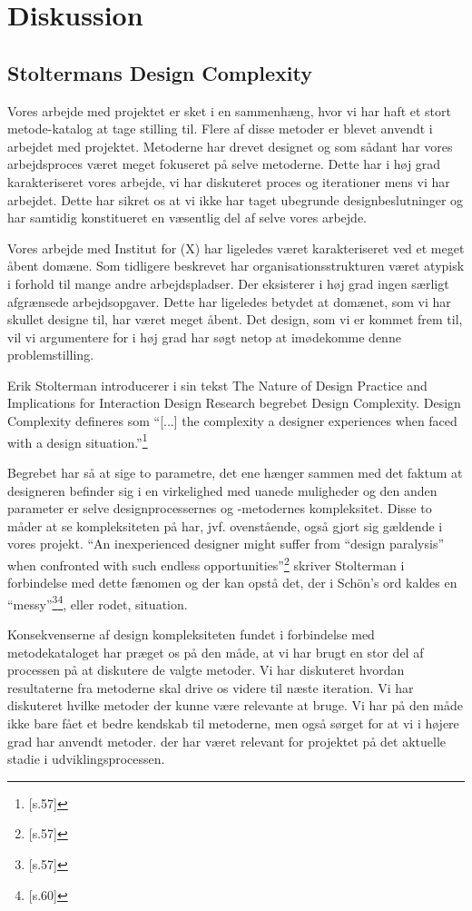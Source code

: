 \chapter{Diskussion}

\section{Stoltermans Design Complexity}
Vores arbejde med projektet er sket i en sammenhæng, hvor vi har haft et stort metode-katalog at tage stilling til. Flere af disse metoder er blevet anvendt i arbejdet med projektet. Metoderne har drevet designet og som sådant har vores arbejdsproces været meget fokuseret på selve metoderne. Dette har i høj grad karakteriseret vores arbejde, vi har diskuteret proces og iterationer mens vi har arbejdet. Dette har sikret os at vi ikke har taget ubegrunde designbeslutninger og har samtidig konstitueret en væsentlig del af selve vores arbejde.

Vores arbejde med Institut for (X) har ligeledes været karakteriseret ved et meget åbent domæne. Som tidligere beskrevet har organisationsstrukturen været atypisk i forhold til mange andre arbejdspladser. Der eksisterer i høj grad ingen særligt afgrænsede arbejdsopgaver. Dette har ligeledes betydet at domænet, som vi har skullet designe til, har været meget åbent. Det design, som vi er kommet frem til, vil vi argumentere for i høj grad har søgt netop at imødekomme denne problemstilling.

Erik Stolterman introducerer i sin tekst The Nature of Design Practice and Implications
for Interaction Design Research begrebet Design Complexity. Design Complexity defineres som “[...] the complexity a designer experiences when faced with a design situation.”\footnote{\citep{Stolterman}[s.57]}

Begrebet har så at sige to parametre, det ene hænger sammen med det faktum at designeren befinder sig i en virkelighed med uanede muligheder og den anden parameter er selve designprocessernes og -metodernes kompleksitet. Disse to måder at se kompleksiteten på har, jvf. ovenstående, også gjort sig gældende i vores projekt. “An inexperienced designer might suffer from “design paralysis” when confronted with such endless opportunities”\footnote{\citep{Stolterman}[s.57]} skriver Stolterman i forbindelse med dette fænomen og der kan opstå det, der i Schön’s ord kaldes en “messy”\footnote{\citep{Stolterman}[s.57]}\footnote{\citep{Stolterman}[s.60]}, eller rodet, situation.

Konsekvenserne af design kompleksiteten fundet i forbindelse med metodekataloget har præget os på den måde, at vi har brugt en stor del af processen på at diskutere de valgte metoder. Vi har diskuteret hvordan resultaterne fra metoderne skal drive os videre til næste iteration. Vi har diskuteret hvilke metoder der kunne være relevante at bruge. Vi har på den måde ikke bare fået et bedre kendskab til metoderne, men også sørget for at vi i højere grad har anvendt metoder. der har været relevant for projektet på det aktuelle stadie i udviklingsprocessen. 

